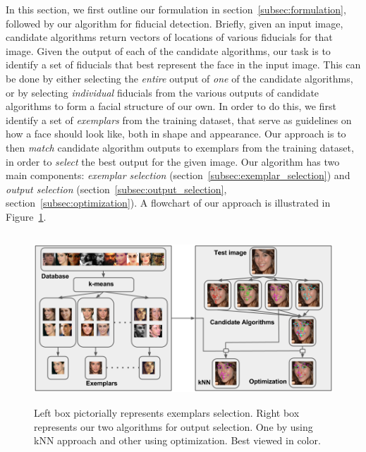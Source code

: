 In this section, we first outline our formulation in section~\ref{subsec:formulation}, followed 
by our algorithm for fiducial detection.
Briefly, given an input image, candidate algorithms return vectors of locations of
various fiducials for that image. Given the output of each of the candidate algorithms, our task
is to identify a set of fiducials that best represent the face in the input image. This can be done
by either selecting the \emph{entire} output of \emph{one} of the candidate algorithms, or by
selecting \emph{individual} fiducials from the various outputs of candidate algorithms to form a facial
structure of our own. In order to do this, we first identify a set of \emph{exemplars} from the
training dataset, that serve as guidelines on how a face should look like, both in shape and
appearance. Our approach is to then \emph{match} candidate algorithm outputs to exemplars from the
training dataset, in order to \emph{select} the best output for the given image.
Our algorithm has two main components: \emph{exemplar selection} (section~\ref{subsec:exemplar_selection}) and
\emph{output selection} (section~\ref{subsec:output_selection}, section~\ref{subsec:optimization}). A flowchart of our approach
is illustrated in Figure~\ref{fig:outline}.

\begin{figure}
  \centering
\includegraphics[width=5.5in, height=2.5in]{fid/figures/method.png}
\caption{Left box pictorially represents exemplars selection. Right box represents our two algorithms for output selection. One by using kNN approach and other using optimization. Best viewed in color.}
\label{fig:outline}
\end{figure}

